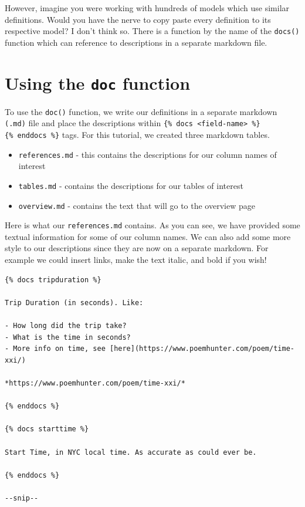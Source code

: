 \documentclass[
]{book}
\begin{document}
However, imagine you were working with hundreds of models which use similar definitions. Would you have the nerve to copy paste every definition to its respective model? I don't think so. There is a function by the name of the \texttt{docs()} function which can reference to descriptions in a separate markdown file.

\hypertarget{using-the-doc-function}{%
\section{\texorpdfstring{Using the \texttt{doc} function}{Using the doc function}}\label{using-the-doc-function}}

To use the \texttt{doc()} function, we write our definitions in a separate markdown \texttt{(.md)} file and place the descriptions within \texttt{\{\%\ docs\ \textless{}field-name\textgreater{}\ \%\}} \texttt{\{\%\ enddocs\ \%\}} tags. For this tutorial, we created three markdown tables.

\begin{itemize}
\item
  \texttt{references.md} - this contains the descriptions for our column names of interest
\item
  \texttt{tables.md} - contains the descriptions for our tables of interest
\item
  \texttt{overview.md} - contains the text that will go to the overview page
\end{itemize}

Here is what our \texttt{references.md} contains. As you can see, we have provided some textual information for some of our column names. We can also add some more style to our descriptions since they are now on a separate markdown. For example we could insert links, make the text italic, and bold if you wish!

\begin{verbatim}
{% docs tripduration %}

Trip Duration (in seconds). Like:

- How long did the trip take?
- What is the time in seconds?
- More info on time, see [here](https://www.poemhunter.com/poem/time-xxi/)

*https://www.poemhunter.com/poem/time-xxi/*

{% enddocs %}

{% docs starttime %}

Start Time, in NYC local time. As accurate as could ever be.

{% enddocs %}

--snip--
\end{verbatim}
\end{document}

